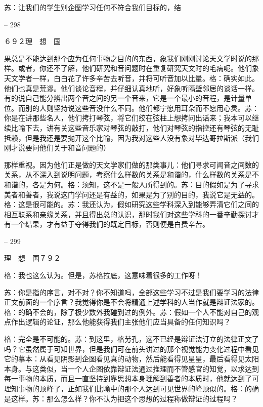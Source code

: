 \documentclass[11pt,oneside]{book}
\begin{document}
\begin{common-format}
    苏：让我们的学生别企图学习任何不符合我们目标的，结

    

-- 298

    ６９２理　想　国

    果总是不能达到那个应为任何事物之目的的东西，象我们刚刚讨论天文学时说的那样。或者，你还不了解，他们研究和音问题时在重复研究天文时的毛病呢。他们象天文学者一样，白白花了许多辛苦去听音，并将可听音加以比量。格：确实如此。他们也真是荒谬。他们谈论音程，并仔细认真地听，好象听隔壁邻居的谈话一样。有的说自己能分辨出两个音之间的另一个音来，它是一个最小的音程，是计量单位。而别的人则坚持说这些音没什么不同。他们都宁愿用耳朵而不愿用心灵。苏：你是在讲那些名人，他们拷打琴弦，将它们绞在弦柱上想拷问出话来；我本可以继续比喻下去，讲有关这些音乐家对琴弦的敲打，他们对琴弦的指控还有琴弦的无耻抵赖，但是我还是要抛开这个比喻，因为我对这些人没有象对毕达哥拉斯派（我们刚才说要问他们关于和音问题的）

    那样重视。因为他们正是做的天文学家们做的那类事儿：他们寻求可闻音之间数的关系，从不深入到说明问题，考察什么样数的关系是和谐的，什么样数的关系是不和谐的，各是为何。格：须知，这不是一般人所得到的。苏：目的假如是为了寻求美者和善者，我说这门学问还是有益的，如果是为了别的目的，我说它是无益的。格：这是很可能的。苏：我还认为，假如研究这些学科深入到能够弄清它们之间的相互联系和亲缘关系，并且得出总的认识，那时我们对这些学科的一番辛勤探讨才有一个结果，才有益于夺得我们的既定目标，否则便是白费辛苦。

    

-- 299

    理　想　国７９２

    格：我也这么认为。但是，苏格拉底，这意味着很多的工作呀！

    苏：你是指的序言，对不对？你不知道吗，全部这些学习不过是我们要学习的法律正文前面的一个序言？我觉得你是不会将精通上述学科的人当作就是辩证法家的。格：的确不会的，除了极少数外我碰到过的例外。苏：假如一个人不能对自己的观点作出逻辑的论证，那么他能获得我们主张他们应当具备的任何知识吗？

    格：完全是不可能的。苏：到这里，格劳孔，这不已经是辩证法订立的法律正文了吗？它虽然属于可知世界，但是我们可在前头讲过的那个视觉能力变化过程中看见它的摹本：从看见阴影到企图看见真的动物，然后能看得见星星，最后看得见太阳本身。与这类似，当一个人企图依靠辩证法通过推理而不管感官的知觉，以求达到每一事物的本质，而且一直坚持到靠思想本身理解到善者的本质时，他就达到了可理知事物的顶峰了，正如我们比喻中的那个人达到可见世界的峰顶似的。格：的确是这样。苏：那么怎么样？你不认为把这个思想的过程称做辩证的过程吗？


\end{common-format}
\end{document}
